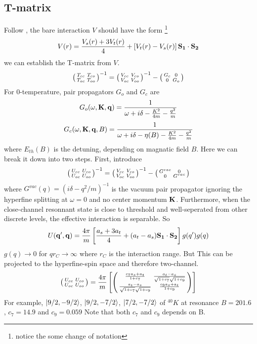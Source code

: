 \subsection{T-matrix}
Follow \cite{JacksonNarrow}, the bare interaction $V$ should have the form \footnote{notice the some change of notation}
\begin{equation}
V(r)=\frac{V_s(r)+3V_t(r)}{4}+\left[V_t(r)-V_s(r)\right]\mathbf{S_1}\cdot\mathbf{S_2}
\end{equation}
we can establish the T-matrix from $V$.
\begin{equation}
 {\ensuremath{\left(\begin{smallmatrix}T_{cc}&T_{co}\\T_{oc}&T_{oo}\end{smallmatrix}\right)}}^{-1}={\left(\begin{smallmatrix}V_{cc}&V_{co}\\V_{oc}&V_{oo}\end{smallmatrix}\right)}^{-1}-{\left(\begin{smallmatrix}G_{c}&0\\0&G_{o}\end{smallmatrix}\right)}
\end{equation}
For 0-temperature, pair propagators $G_o$ and $G_c$ are
\begin{equation}
 G_o(\omega,\mathbf{K},\mathbf{q})=\frac{1}{\omega+i\delta-\frac{K^2}{4m}-\frac{q^2}{m}}
\end{equation}
\begin{equation}
 G_c(\omega,\mathbf{K},\mathbf{q},B)=\frac{1}{\omega+i\delta-\eta(B)-\frac{K^2}{4m}-\frac{q^2}{m}}
\end{equation}
where $E_{th}(B)$ is the detuning, depending on magnatic field $B$. Here we can break it down into two steps. First, introduce 
 \begin{equation}
 {\ensuremath{\left(\begin{smallmatrix}U_{cc}&U_{co}\\U_{oc}&U_{oo}\end{smallmatrix}\right)}}^{-1}={\left(\begin{smallmatrix}V_{cc}&V_{co}\\V_{oc}&V_{oo}\end{smallmatrix}\right)}^{-1}-{\left(\begin{smallmatrix}G^{vac}&0\\0&G^{vac}\end{smallmatrix}\right)}
\end{equation}
where $G^{vac}(q)=(i\delta-q^2/m)^{-1}$ is the vacuum pair propagator ignoring the hyperfine splitting at $\omega=0$ and no center momentum $\mathbf{K}$.  Furthermore, when the close-channel resonnant state is close to threshold and well-seperated from other discrete levels, the effective interaction is separable.  So 
\begin{equation}
 U(\mathbf{q}',\mathbf{q})=\frac{4\pi}{m}\left[\frac{a_s+3a_t}{4}+(a_t-a_s)\mathbf{S_1}\cdot\mathbf{S_2}\right]g(q')g(q)
\end{equation}
$g(q)\rightarrow0$ for $qr_C\rightarrow\infty$ where $r_C$ is the interaction range.  But This can be projected to the hyperfine-spin space and therefore two-channel.  
\begin{equation}
 {\ensuremath{\left(\begin{smallmatrix}U_{cc}&U_{co}\\U_{oc}&U_{oo}\end{smallmatrix}\right)}}=
\frac{4\pi}{m}\left[\left(\begin{smallmatrix}\frac{c_7a_s+a_t}{1+c_7}&\frac{a_t-a_s}{\sqrt{1+c_7}\sqrt{1+c_9}}\\\frac{a_t-a_s}{\sqrt{1+c_7}\sqrt{1+c_9}}&\frac{c_9a_s+a_t}{1+c_9}\end{smallmatrix}\right)\right]
\end{equation}
For example, $\left|9/2,-9/2\right>$, $\left|9/2,-7/2\right>$, $\left|7/2,-7/2\right>$ of ${}^{40}K$ at resonance $B=201.6$, $c_7=14.9$ and $c_9=0.059$ Note that both $c_7$ and $c_9$ depends on B.  

